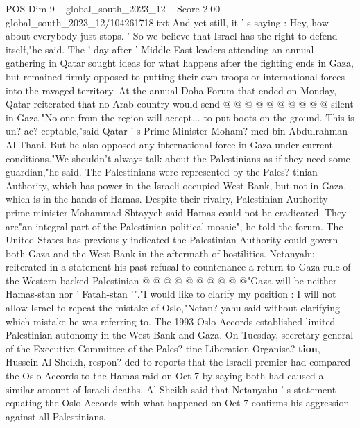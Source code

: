 \begin{textsample}{POS Dim 9 – global\_south\_2023\_12 – Score 2.00 – global\_south\_2023\_12/104261718.txt}
And yet still, it ' s saying : Hey, how about everybody just stops. ' So we believe that Israel has the right to defend itself,"he said.
The ' day after ' Middle East leaders attending an annual gathering in Qatar sought ideas for what happens after the fighting ends in Gaza, but remained firmly opposed to putting their own troops or international forces into the ravaged territory.
At the annual Doha Forum that ended on Monday, Qatar reiterated that no Arab country would send @ @ @ @ @ @ @ @ @ @ silent in Gaza."No one from the region will accept... to put boots on the ground.
This is un? ac? ceptable,"said Qatar ' s Prime Minister Moham? med bin Abdulrahman Al Thani.
But he also opposed any international force in Gaza under current conditions."We shouldn't always talk about the Palestinians as if they need some guardian,"he said.
The Palestinians were represented by the Pales? tinian Authority, which has power in the Israeli-occupied West Bank, but not in Gaza, which is in the hands of Hamas.
Despite their rivalry, Palestinian Authority prime minister Mohammad Shtayyeh said Hamas could not be eradicated.
They are"an integral part of the Palestinian political mosaic", he told the forum.
The United States has previously indicated the Palestinian Authority could govern both Gaza and the West Bank in the aftermath of hostilities.
Netanyahu reiterated in a statement his past refusal to countenance a return to Gaza rule of the Western-backed Palestinian @ @ @ @ @ @ @ @ @ @"Gaza will be neither Hamas-stan nor ' Fatah-stan '"."I would like to clarify my position : I will not allow Israel to repeat the mistake of Oslo,"Netan? yahu said without clarifying which mistake he was referring to.
The 1993 Oslo Accords established limited Palestinian autonomy in the West Bank and Gaza.
On Tuesday, secretary general of the Executive Committee of the Pales? tine Liberation Organisa? \textbf{tion}, Hussein Al Sheikh, respon? ded to reports that the Israeli premier had compared the Oslo Accords to the Hamas raid on Oct 7 by saying both had caused a similar amount of Israeli deaths.
Al Sheikh said that Netanyahu ' s statement equating the Oslo Accords with what happened on Oct 7 confirms his aggression against all Palestinians.

\end{textsample}
